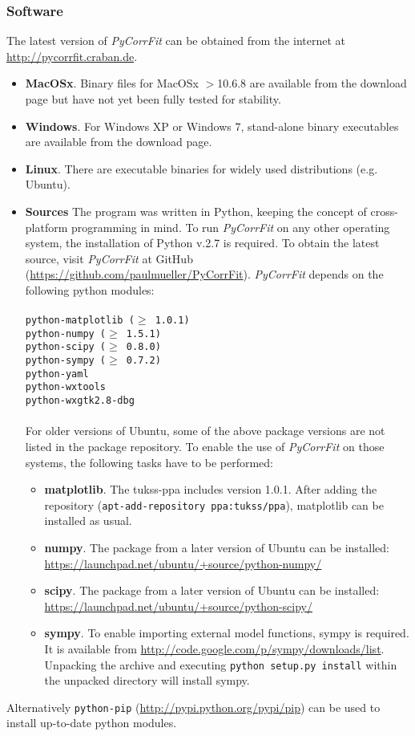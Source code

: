 \subsubsection{Software}
\label{sec:intro.prere.softw}
The latest version of \textit{PyCorrFit} can be obtained from the internet at \url{http://pycorrfit.craban.de}.
\begin{itemize}
\item \textbf{MacOSx}.
Binary files for MacOSx $>$10.6.8 are available from the download page but have not yet been fully tested for stability.
\item \textbf{Windows}.
For Windows XP or Windows 7, stand-alone binary executables are available from the download page. 
\item \textbf{Linux}.
There are executable binaries for widely used distributions (e.g. Ubuntu).
\item \textbf{Sources}
The program was written in Python, keeping the concept of cross-platform programming in mind. To run \textit{PyCorrFit} on any other operating system, the installation of Python v.2.7 is required. To obtain the latest source, visit \textit{PyCorrFit} at GitHub (\url{https://github.com/paulmueller/PyCorrFit}). \textit{PyCorrFit} depends on the following python modules:\\
\texttt{\\
python-matplotlib ($\geq$ 1.0.1) \\
python-numpy ($\geq$ 1.5.1) \\
python-scipy ($\geq$ 0.8.0) \\
python-sympy ($\geq$ 0.7.2) \\
python-yaml \\
python-wxtools \\
python-wxgtk2.8-dbg \\
}
\\
For older versions of Ubuntu, some of the above package versions are not listed in the package repository. To enable the use of \textit{PyCorrFit} on those systems, the following tasks have to be performed:
\begin{itemize}
\item[ ] \textbf{matplotlib}. The tukss-ppa includes version 1.0.1. After adding the repository (\texttt{apt-add-repository ppa:tukss/ppa}), matplotlib can be installed as usual.
\item[ ] \textbf{numpy}. The package from a later version of Ubuntu can be installed: \url{https://launchpad.net/ubuntu/+source/python-numpy/}
\item[ ] \textbf{scipy}. The package from a later version of Ubuntu can be installed: \url{https://launchpad.net/ubuntu/+source/python-scipy/}
\item[ ] \textbf{sympy}. To enable importing external model functions, sympy is required. It is available from \url{http://code.google.com/p/sympy/downloads/list}. Unpacking the archive and executing \texttt{python setup.py install} within the unpacked directory will install sympy.
\end{itemize}
\end{itemize}
Alternatively \texttt{python-pip} (\url{http://pypi.python.org/pypi/pip}) can be used to install up-to-date python modules.

